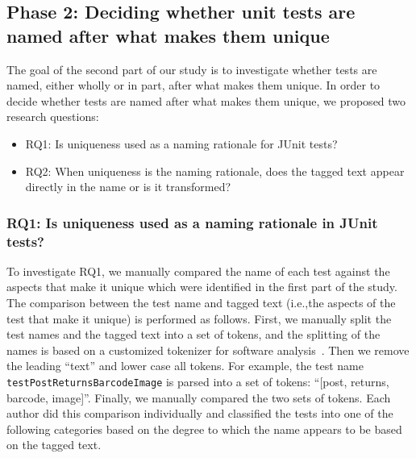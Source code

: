 \subsection{Phase 2: Deciding whether unit tests are named after what makes them unique}

The goal of the second part of our study is to investigate whether tests are named, either wholly or in part, after what makes them unique.
%
In order to decide whether tests are named after what makes them unique, we proposed two research questions:
\begin{itemize}
    \item RQ1: Is uniqueness used as a naming rationale for JUnit tests?
    \item RQ2: When uniqueness is the naming rationale, does the tagged text appear directly in the name or is it transformed?
\end{itemize}

\subsubsection{RQ1: Is uniqueness used as a naming rationale in JUnit tests?}

To investigate RQ1, we manually compared the name of each test against the aspects that make it unique which were identified in the first part of the study.
%
The comparison between the test name and tagged text (i.e.,the aspects of the test that make it unique) is performed as follows.
%
First, we manually split the test names and the tagged text into a set of tokens, and the splitting of the names is based on a customized tokenizer for software analysis~\cite{enslen2009mining}.
%
Then we remove the leading \enquote{text} and lower case all tokens. For example, the test name \texttt{testPostReturnsBarcodeImage} is parsed into a set of tokens: \enquote{[post, returns, barcode, image]}.
%
Finally, we manually compared the two sets of tokens. Each author did this comparison individually and classified the tests into one of the following categories based on the degree to which the name appears to be based on the tagged text.


